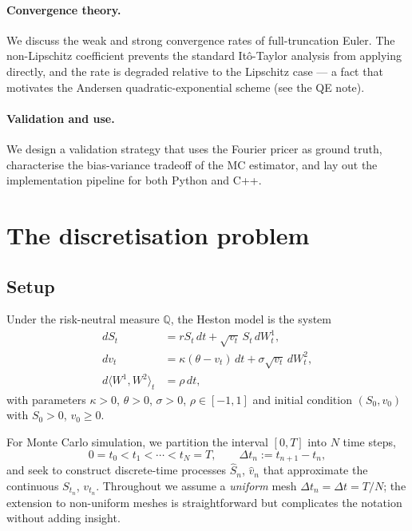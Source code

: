 \documentclass[11pt]{article}
\theoremstyle{plain}
\theoremstyle{definition}
\theoremstyle{remark}
\begin{document}
\paragraph{Convergence theory.} We discuss the weak and strong convergence rates of full-truncation Euler. The non-Lipschitz coefficient prevents the standard Itô-Taylor analysis from applying directly, and the rate is degraded relative to the Lipschitz case --- a fact that motivates the Andersen quadratic-exponential scheme (see the QE note).

\paragraph{Validation and use.} We design a validation strategy that uses the Fourier pricer as ground truth, characterise the bias-variance tradeoff of the MC estimator, and lay out the implementation pipeline for both Python and C++.

\section{The discretisation problem}

\subsection{Setup}

Under the risk-neutral measure $\mathbb{Q}$, the Heston model is the system
\begin{align}
    dS_t &= r S_t\,dt + \sqrt{v_t}\, S_t\,dW^1_t,                                \label{eq:heston-S}\\
    dv_t &= \kappa(\theta - v_t)\,dt + \sigma\sqrt{v_t}\,dW^2_t,                 \label{eq:heston-v}\\
    d\langle W^1, W^2\rangle_t &= \rho\,dt,                                      \label{eq:heston-corr}
\end{align}
with parameters $\kappa > 0$, $\theta > 0$, $\sigma > 0$, $\rho \in [-1, 1]$ and initial condition $(S_0, v_0)$ with $S_0 > 0$, $v_0 \geq 0$.

For Monte Carlo simulation, we partition the interval $[0, T]$ into $N$ time steps,
\[
    0 = t_0 < t_1 < \cdots < t_N = T, \qquad \Delta t_n := t_{n+1} - t_n,
\]
and seek to construct discrete-time processes $\hat S_n$, $\hat v_n$ that approximate the continuous $S_{t_n}$, $v_{t_n}$. Throughout we assume a \emph{uniform} mesh $\Delta t_n = \Delta t = T/N$; the extension to non-uniform meshes is straightforward but complicates the notation without adding insight.
\end{document}
